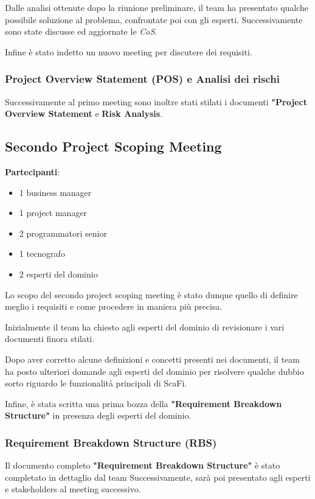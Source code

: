 Dalle analisi ottenute dopo la riunione preliminare, il team ha presentato qualche possibile soluzione al problema, confrontate poi con gli esperti.
Successivamente sono state discusse ed aggiornate le \textit{CoS}.

Infine è stato indetto un nuovo meeting per discutere dei requisiti.

\subsubsection{Project Overview Statement (POS) e Analisi dei rischi}
Successivamente al primo meeting sono inoltre stati stilati i documenti \textbf{"Project Overview Statement} e \textbf{Risk Analysis}.

\subsection{Secondo Project Scoping Meeting}
\textbf{Partecipanti}:
\begin{itemize}
    \item 1 business manager
    \item 1 project manager
    \item 2 programmatori senior
    \item 1 tecnografo
    \item 2 esperti del dominio
\end{itemize}

Lo scopo del secondo project scoping meeting è stato dunque quello di definire meglio i requisiti e come procedere in maniera più precisa.

Inizialmente il team ha chiesto agli esperti del dominio di revisionare i vari documenti finora stilati.

Dopo aver corretto alcune definizioni e concetti presenti nei documenti, il team ha posto ulteriori domande agli esperti del dominio per risolvere
qualche dubbio sorto riguardo le funzionalità principali di ScaFi.

Infine, è stata scritta una prima bozza della \textbf{"Requirement Breakdown Structure"} in presenza degli esperti del dominio.

\subsubsection{Requirement Breakdown Structure (RBS)}
Il documento completo \textbf{"Requirement Breakdown Structure"} è stato completato in dettaglio dal team Successivamente, sarà poi presentato agli esperti e stakeholders al meeting successivo.

